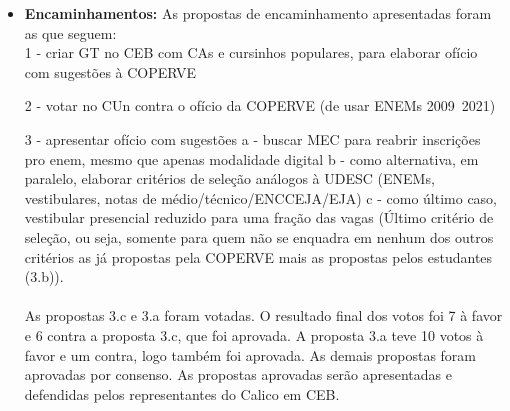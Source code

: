 \documentclass{ata-calico}
\begin{document}
\begin{itemize}
    \item \textbf{Encaminhamentos:} As propostas de encaminhamento apresentadas foram as que seguem:\\
    1 - criar GT no CEB com CAs e cursinhos populares, para elaborar ofício com sugestões à COPERVE

    2 - votar no CUn contra o ofício da COPERVE (de usar ENEMs 2009~2021)

    3 - apresentar ofício com sugestões
        a - buscar MEC para reabrir inscrições pro enem, mesmo que apenas modalidade digital
        b - como alternativa, em paralelo, elaborar critérios de seleção análogos à UDESC (ENEMs, vestibulares, notas de médio/técnico/ENCCEJA/EJA)
        c - como último caso, vestibular presencial reduzido para uma fração das vagas (Último critério de seleção, ou seja, somente para quem não se enquadra em nenhum dos outros critérios as já propostas pela COPERVE mais as propostas pelos estudantes (3.b)). \\ \\
    As propostas 3.c e 3.a foram votadas. O resultado final dos votos foi 7 à favor e 6 contra  a proposta 3.c, que foi aprovada. A proposta 3.a teve 10 votos à favor e um contra, logo também foi aprovada. As demais propostas foram aprovadas por consenso. As propostas aprovadas serão apresentadas e defendidas pelos representantes do Calico em CEB.
        
\end{itemize}
\end{document}
